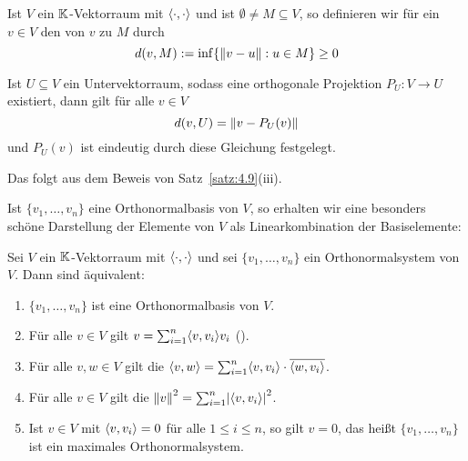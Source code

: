 \begin{definition}[Abstand]
	\label{def:4.10}
	Ist $V$ ein $\mathbb{K}$-Vektorraum mit $\left\langle\cdot,\cdot\right\rangle$ und ist $\emptyset \neq M \subseteq V$, so definieren wir für ein $v \in V$ den  von $v$ zu $M$ durch
	\[
		d(v,M) := \inf \{ \left\lVert v-u\right\rVert : u \in M\} \geq 0
	\]
\end{definition}

\begin{korollar}
	\label{kor:4.11}
	Ist $U \subseteq V$ ein Untervektorraum, sodass eine orthogonale Projektion $P_U\colon V \rightarrow U$ existiert, dann gilt für alle $v \in V$
	\[
		d(v,U) = \left\lVert v - P_U(v)\right\rVert
	\]
	und $P_U(v)$ ist eindeutig durch diese Gleichung festgelegt.
\end{korollar}

\begin{beweis}
	Das folgt aus dem Beweis von Satz~\ref{satz:4.9}(iii). 
\end{beweis}

Ist $\{v_1,\dots,v_n\}$ eine Orthonormalbasis von $V$, so erhalten wir eine besonders schöne Darstellung der Elemente von $V$ als Linearkombination der Basiselemente:

\begin{satz}[Fourierentwicklung]
	\label{satz:4.12}
	Sei $V$ ein $\mathbb{K}$-Vektorraum mit $\left\langle\cdot,\cdot\right\rangle$ und sei $\{v_1,\dots,v_n\}$ ein Orthonormalsystem von $V$.
	Dann sind äquivalent:
	\begin{enumerate}[(1)]
		\item $\{v_1,\dots,v_n\}$ ist eine Orthonormalbasis von $V$.
		\item Für alle $v \in V$ gilt $v = \sum_{i=1}^{n} \sk{v,v_i} v_i$ ().
		\item Für alle $v,w \in V$ gilt die  $\sk{v,w} = \sum_{i=1}^{n} \sk{v,v_i} \cdot \ol{\sk{w,v_i}}$.
		\item Für alle $v \in V$ gilt die  $\no{v}^2 = \sum_{i=1}^{n} \abs{\sk{v,v_i}}^2$.
		\item Ist $v \in V$ mit $\left\langle v,v_i\right\rangle = 0$ für alle $1 \leq i \leq n$, so gilt $v = 0$, das heißt $\{v_1,\dots,v_n\}$ ist ein maximales Orthonormalsystem.
	\end{enumerate}
\end{satz}

